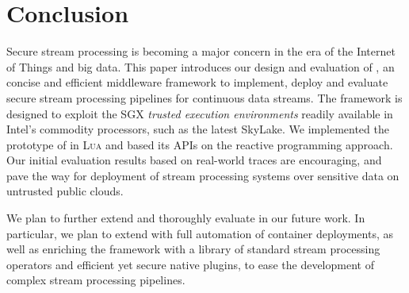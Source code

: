 \section{Conclusion}
\label{sec:conclusion}

Secure stream processing is becoming a major concern in the era of the Internet of Things and big data.
This paper introduces our design and evaluation of \SYS{}, an concise and efficient middleware framework to implement, deploy and evaluate secure stream processing pipelines for continuous data streams.
The framework is designed to exploit the SGX \emph{trusted execution environments} readily available in Intel{\textregistered}'s commodity processors, such as the latest SkyLake.
We implemented the prototype of \SYS{} in \textsc{Lua} and based its APIs on the reactive programming approach.
Our initial evaluation results based on real-world traces are encouraging, and pave the way for deployment of stream processing systems over sensitive data on untrusted public clouds.

We plan to further extend and thoroughly evaluate \SYS in our future work.
In particular, we plan to extend \SYS with full automation of container deployments, as well as enriching the framework with a library of standard stream processing operators and efficient yet secure native plugins, to ease the development of complex stream processing pipelines.
\newpage
